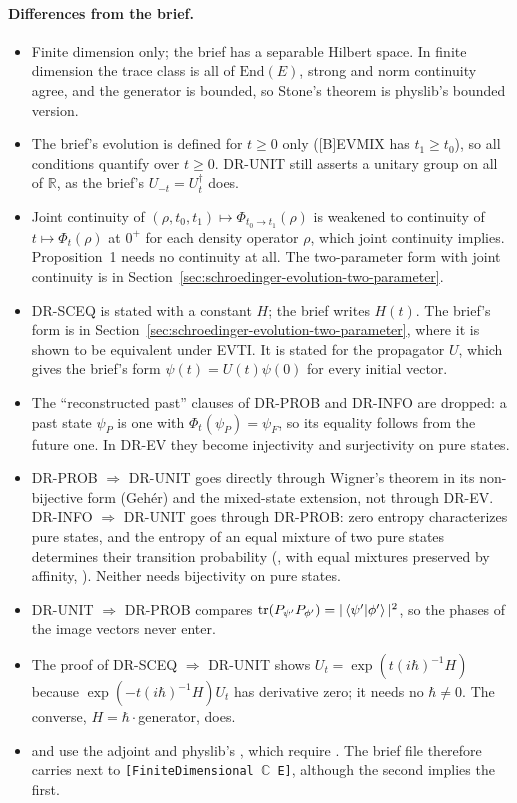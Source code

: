 \documentclass[11pt]{article}
\begin{document}
\paragraph{Differences from the brief.}
\begin{itemize}
\item Finite dimension only; the brief has a separable Hilbert space. In finite dimension the
  trace class is all of $\mathrm{End}(E)$, strong and norm continuity agree, and the generator is
  bounded, so Stone's theorem is physlib's bounded version.
\item The brief's evolution is defined for $t \ge 0$ only ([B]EVMIX has $t_1 \ge t_0$), so all
  conditions quantify over $t \ge 0$. DR-UNIT still asserts a unitary group on all of
  $\mathbb{R}$, as the brief's $U_{-t} = U_t^\dagger$ does.
\item Joint continuity of $(\rho, t_0, t_1) \mapsto \Phi_{t_0 \to t_1}(\rho)$ is weakened to
  continuity of $t \mapsto \Phi_t(\rho)$ at $0^+$ for each density operator $\rho$, which joint
  continuity implies. Proposition~1 needs no continuity at all. The two-parameter
  form with joint continuity is in Section~\ref{sec:schroedinger-evolution-two-parameter}.
\item DR-SCEQ is stated with a constant $H$; the brief writes $H(t)$. The brief's form is in
  Section~\ref{sec:schroedinger-evolution-two-parameter}, where it is shown to be equivalent
  under EVTI. It is stated for the propagator $U$, which gives the brief's form
  $\psi(t) = U(t)\psi(0)$ for every initial vector.
\item The ``reconstructed past'' clauses of DR-PROB and DR-INFO are dropped: a past state $\psi_P$
  is one with $\Phi_t(\psi_P) = \psi_F$, so its equality follows from the future one. In DR-EV
  they become injectivity and surjectivity on pure states.
\item DR-PROB $\Rightarrow$ DR-UNIT goes directly through Wigner's theorem in its non-bijective
  form (Geh\'er) and the mixed-state extension, not through DR-EV. DR-INFO $\Rightarrow$ DR-UNIT
  goes through DR-PROB: zero entropy characterizes pure states, and the entropy of an equal
  mixture of two pure states determines their transition probability
  (, with equal mixtures preserved by affinity,
  ). Neither needs bijectivity on pure states.
\item DR-UNIT $\Rightarrow$ DR-PROB compares $\operatorname{tr}(P_{\psi'}P_{\phi'}) =
  |\braket{\psi'|\phi'}|^2$, so the phases of the image vectors never enter.
\item The proof of DR-SCEQ $\Rightarrow$ DR-UNIT shows $U_t = \exp(t(i\hbar)^{-1}H)$ because
  $\exp(-t(i\hbar)^{-1}H)U_t$ has derivative zero; it needs no $\hbar \ne 0$. The converse,
  $H = \hbar\cdot$generator, does.
\item {} and  use the adjoint and physlib's
  , which require . The brief file therefore
  carries \lean{[CompleteSpace E]} next to \texttt{[FiniteDimensional $\mathbb{C}$ E]}, although
  the second implies the first.
\end{itemize}
\end{document}
